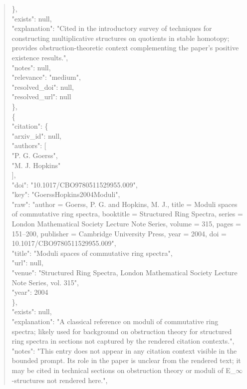 \documentclass[11pt]{article}
\begin{document}
\begin{quote}
      \},\\
      "exists": null,\\
      "explanation": "Cited in the introductory survey of techniques for constructing multiplicative structures on quotients in stable homotopy; provides obstruction-theoretic context complementing the paper's positive existence results.",\\
      "notes": null,\\
      "relevance": "medium",\\
      "resolved\_doi": null,\\
      "resolved\_url": null\\
    \},\\
    \{\\
      "citation": \{\\
        "arxiv\_id": null,\\
        "authors": [\\
          "P. G. Goerss",\\
          "M. J. Hopkins"\\
        ],\\
        "doi": "10.1017/CBO9780511529955.009",\\
        "key": "GoerssHopkins2004Moduli",\\
        "raw": "author = Goerss, P. G. and Hopkins, M. J., title = Moduli spaces of commutative ring spectra, booktitle = Structured Ring Spectra, series = London Mathematical Society Lecture Note Series, volume = 315, pages = 151--200, publisher = Cambridge University Press, year = 2004, doi = 10.1017/CBO9780511529955.009",\\
        "title": "Moduli spaces of commutative ring spectra",\\
        "url": null,\\
        "venue": "Structured Ring Spectra, London Mathematical Society Lecture Note Series, vol. 315",\\
        "year": 2004\\
      \},\\
      "exists": null,\\
      "explanation": "A classical reference on moduli of commutative ring spectra; likely used for background on obstruction theory for structured ring spectra in sections not captured by the rendered citation contexts.",\\
      "notes": "This entry does not appear in any citation context visible in the bounded prompt. Its role in the paper is unclear from the rendered text; it may be cited in technical sections on obstruction theory or moduli of E\_\ensuremath{\infty}-structures not rendered here.",\\

\end{quote}
\end{document}
